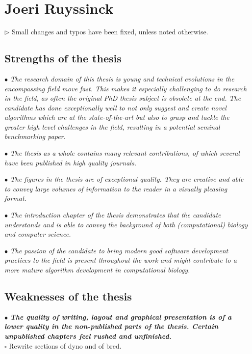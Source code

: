 \documentclass[10pt]{article}
\newcommand{\todo}{$\square$}
\newcommand{\exam}[2][\  ]{\hspace{0pt}\marginpar{\color{myred}#1}$\bullet$ \textit{#2}}
\newcommand{\imp}[1]{\textbf{#1}}
\newcommand{\nimp}[1]{{\color{mygray} #1}}
\newcommand{\answ}[1]{{\color{myblue} $\triangleright$ #1}}
\newcommand{\task}[2][\todo]{{\color{myblue} #1 #2}}
\newcommand{\bigexclaim}{\raisebox{-0.1em}{\BigTriangleUp}\hspace{-0.32em}\llap{\small\textbf{!}}\hspace{0.32em}}
\newcommand{\tagimp}{\bigexclaim}
\newcommand{\tagtime}{{\Large $\hourglass$}}
\begin{document}
\section{Joeri Ruyssinck}

\answ{Small changes and typos have been fixed, unless noted otherwise.}

\subsection{Strengths of the thesis}

\exam{\nimp{The research domain of this thesis is young and technical evolutions in the
	encompassing field move fast. This makes it especially challenging to do
	research in the field, as often the original PhD thesis subject is obsolete at the
	end. The candidate has done exceptionally well to not only suggest and create
	novel algorithms which are at the state-of-the-art but also to grasp and tackle
	the greater high level challenges in the field, resulting in a potential seminal
	benchmarking paper.}}

\exam{\nimp{The thesis as a whole contains many relevant contributions, of which several
	have been published in high quality journals.}}

\exam{\nimp{The figures in the thesis are of exceptional quality. They are creative and able
	to convey large volumes of information to the reader in a visually pleasing
	format.}}

\exam{\nimp{The introduction chapter of the thesis demonstrates that the candidate
	understands and is able to convey the background of both (computational)
	biology and computer science.}}

\exam{\nimp{The passion of the candidate to bring modern good software development
	practices to the field is present throughout the work and might contribute to a
	more mature algorithm development in computational biology.}}



\subsection{Weaknesses of the thesis} \label{sec:joeriweakness}
\exam[\tagimp \tagtime]{\imp{The quality of writing, layout and graphical presentation is of a lower quality in the non-published parts of the thesis. Certain unpublished chapters feel rushed and unfinished.}} \\
\task{Rewrite sections of dyno and of bred.}
\end{document}
